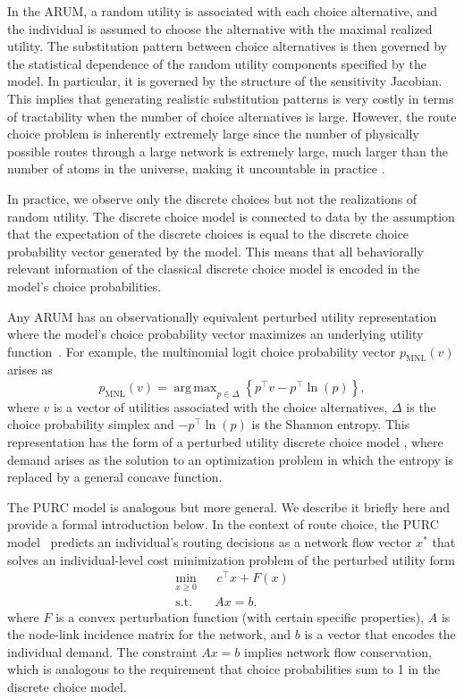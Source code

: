 \documentclass[a4paper,11pt]{article}
\DeclareMathOperator*{\argmax}{arg\,max}
\begin{document}
In the ARUM, a random utility is associated with each choice alternative, and the individual is assumed to choose the alternative with the maximal realized utility. The substitution pattern between choice alternatives is then governed by the statistical dependence of the random utility components specified by the model. In particular, it is governed by the structure of the sensitivity Jacobian.  
This implies that generating realistic substitution patterns is very costly in terms of tractability when the number of choice alternatives is large. However, the route choice problem is inherently extremely large since the number of physically possible routes through a large network is extremely large, much larger than the number of atoms in the universe, making it uncountable in practice \citep{roberts_estimating_2007}.

In practice, we observe only the discrete choices but not the realizations of random utility. The discrete choice model is connected to data by the assumption that the expectation of the discrete choices is equal to the discrete choice probability vector generated by the model. This means that all behaviorally relevant information of the classical discrete choice model is encoded in the model's choice probabilities. 

Any ARUM has an observationally equivalent perturbed utility representation where the model's choice probability vector maximizes an underlying utility function~\citep{Hofbauer2002, Sorensen2019}. For example, the multinomial logit choice probability vector $p_{\text{MNL}}(v)$ arises as 
\[p_{\text{MNL}}(v) = \argmax_{p \in \Delta} \left\{ p^\intercal v - p^\intercal \ln(p) \right\},\]   where $v$ is a vector of utilities associated with the choice alternatives, $\Delta$ is the choice probability simplex and $-p^\intercal \ln(p)$ is the Shannon entropy. This representation has the form of a perturbed utility discrete choice model \citep{fosgerau2012theory,allen2019identification,fosgerau_inverse_2024}, where demand arises as the solution to an optimization problem in which the entropy is replaced by a general concave function. 


The PURC model is analogous but more general. We describe it briefly here and provide a formal introduction below. In the context of route choice, the PURC model~\citep{Fosgerau2021a} predicts an individual's routing decisions as a network flow vector $x^*$ that solves an individual-level cost minimization problem of the perturbed utility form 
\begin{subequations}
\label{eq:PURC}
\begin{align}
\min_{x \geq 0}&\, c^{\top }x+F(x)
\label{eq:PURC_objective} \\
\text{s.t.}\quad & Ax=b.  \label{eq:PURC_onservation}
\end{align}
\end{subequations}
where $F$ is a convex perturbation function (with certain specific properties), $A$ is the node-link incidence matrix for the network, and $b$ is a vector that encodes the individual demand. The constraint $Ax=b$ implies network flow conservation, which is analogous to the requirement  that choice probabilities sum to 1 in the discrete choice model. 
\end{document}
